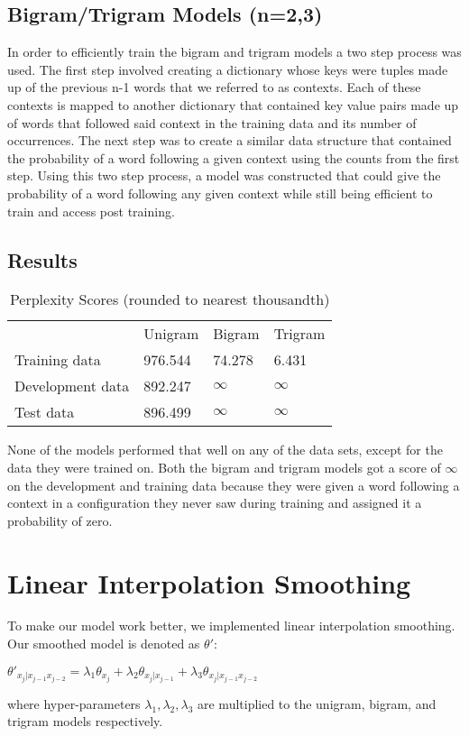 \documentclass[12pt,notitlepage]{article}
\begin{document}
\subsection{Bigram/Trigram Models (n=2,3)}
\tab In order to efficiently train the bigram and trigram models a two step process was used. The first step involved creating a dictionary whose keys were tuples made up of the previous n-1 words that we referred to as contexts. Each of these contexts is mapped to another dictionary that contained key value pairs made up of words that followed said context in the training data and its number of occurrences. The next step was to create a similar data structure that contained the probability of a word following a given context using the counts from the first step. Using this two step process, a model was constructed that could give the probability of a word following any given context while still being efficient to train and access post training. 

\subsection{Results}
\label{section:results}
\begin{table}[H]
\centering
\caption{Perplexity Scores (rounded to nearest thousandth)}
	\begin{tabular}{llll}
	& Unigram & Bigram & Trigram \\
	\cline{2-4} 
	\multicolumn{1}{l|}{Training data} & \multicolumn{1}{l|}{976.544} & \multicolumn{1}{l|}{74.278} & \multicolumn{1}{l|}{6.431} \\
	\cline{2-4} 
	\multicolumn{1}{l|}{Development data} & \multicolumn{1}{l|}{892.247} & \multicolumn{1}{l|}{$\infty$} & \multicolumn{1}{l|}{$\infty$} \\
	\cline{2-4} 
	\multicolumn{1}{l|}{Test data} & \multicolumn{1}{l|}{896.499} & \multicolumn{1}{l|}{$\infty$} & \multicolumn{1}{l|}{$\infty$} \\
	\cline{2-4} 
	\end{tabular}
\end{table}
\tab None of the models performed that well on any of the data sets, except for the data they were trained on. Both the bigram and trigram models got a score of $\infty$ on the development and training data because they were given a word following a context in a configuration they never saw during training and assigned it a probability of zero.

\section{Linear Interpolation Smoothing}
\tab To make our model work better, we implemented linear interpolation smoothing. Our smoothed model is denoted as $\theta'$:
\begin{center}
	$\theta'_{x_{j}|x_{j-1}x_{j-2}}=\lambda_{1}\theta_{x_{j}}+\lambda_{2}\theta_{x_{j}|x_{j-1}}+\lambda_{3}\theta_{x_{j}|x_{j-1}x_{j-2}}$
\end{center}
where hyper-parameters $\lambda_{1}, \lambda_{2}, \lambda_{3}$ are multiplied to the unigram, bigram, and trigram models respectively.
\end{document}
